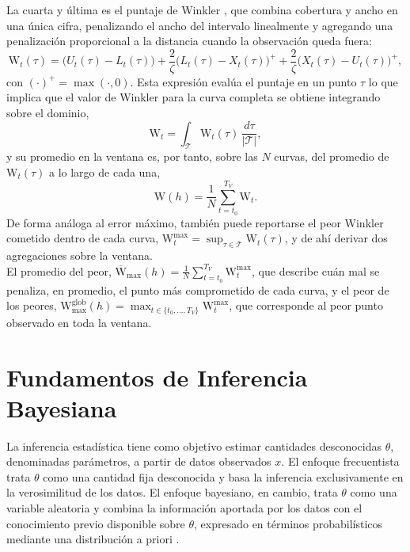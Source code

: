 La cuarta y última es el puntaje de Winkler \cite{02_02_winkler1972decision, 02_02_gneiting2007scoring}, que combina cobertura y ancho en una única cifra, penalizando el ancho del intervalo linealmente y agregando una penalización proporcional a la distancia cuando la observación queda fuera:
\begin{equation}
    \mathrm{W}_t(\tau) = \bigl(U_t(\tau) - L_t(\tau)\bigr)
    + \frac{2}{\zeta}\bigl(L_t(\tau) - X_t(\tau)\bigr)^{+}
    + \frac{2}{\zeta}\bigl(X_t(\tau) - U_t(\tau)\bigr)^{+},
\end{equation}
con $(\cdot)^+ = \max(\cdot, 0)$. Esta expresión evalúa el puntaje en un punto $\tau$ lo que implica que el valor de Winkler para la curva completa se obtiene integrando sobre el dominio,
\begin{equation}
    \mathrm{W}_t = \int_{\mathcal{T}} \mathrm{W}_t(\tau)\, \frac{d\tau}{|\mathcal{T}|},
\end{equation}
y su promedio en la ventana es, por tanto, sobre las $N$ curvas, del promedio de $\mathrm{W}_t(\tau)$ a lo largo de cada una,
\begin{equation}
    \mathrm{W}(h) = \frac{1}{N}\sum_{t=t_0}^{T_V} \mathrm{W}_t.
\end{equation}
De forma análoga al error máximo, también puede reportarse el peor Winkler cometido dentro de cada curva, $\mathrm{W}_t^{\max} = \sup_{\tau \in \mathcal{T}} \mathrm{W}_t(\tau)$, y de ahí derivar dos agregaciones sobre la ventana.\\

El promedio del peor, $\overline{\mathrm{W}}_{\max}(h) =
\frac{1}{N}\sum_{t=t_0}^{T_V} \mathrm{W}_t^{\max}$, que describe cuán mal se penaliza, en promedio, el punto más comprometido de cada curva, y el peor de los peores, $\mathrm{W}_{\max}^{\text{glob}}(h) = \max_{t \in
\{t_0,\dots,T_V\}} \mathrm{W}_t^{\max}$, que corresponde al peor punto observado en toda la ventana. 


\section{Fundamentos de Inferencia Bayesiana}
\label{02_03_00_inferencia_bayesiana}

La inferencia estadística tiene como objetivo estimar cantidades desconocidas $\theta$, denominadas parámetros, a partir de datos observados $x$. El enfoque frecuentista trata $\theta$ como una cantidad fija desconocida y basa la inferencia exclusivamente en la verosimilitud de los datos. El enfoque bayesiano, en cambio, trata $\theta$ como una variable aleatoria y combina la información aportada por los datos con el conocimiento previo disponible sobre $\theta$, expresado en términos probabilísticos mediante una distribución a priori \cite{02_03_bayes1763essay}.\\

